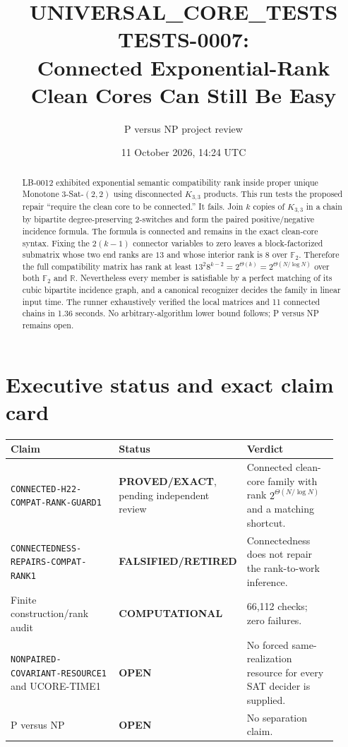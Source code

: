 \documentclass[11pt]{article}
\title{UNIVERSAL\_CORE\_TESTS TESTS-0007:\\
Connected Exponential-Rank Clean Cores Can Still Be Easy}
\author{P versus NP project review}
\date{11 October 2026, 14:24 UTC}
\newcommand{\EXACT}{\textbf{PROVED/EXACT}}
\newcommand{\OPEN}{\textbf{OPEN}}
\newcommand{\RETIRED}{\textbf{FALSIFIED/RETIRED}}
\newcommand{\COMP}{\textbf{COMPUTATIONAL}}
\begin{document}
\maketitle

\begin{abstract}
LB-0012 exhibited exponential semantic compatibility rank inside proper
unique Monotone 3-Sat-$(2,2)$ using disconnected $K_{3,3}$ products.  This
run tests the proposed repair ``require the clean core to be connected.''
It fails.  Join $k$ copies of $K_{3,3}$ in a chain by bipartite
degree-preserving 2-switches and form the paired positive/negative incidence
formula.  The formula is connected and remains in the exact clean-core
syntax.  Fixing the $2(k-1)$ connector variables to zero leaves a
block-factorized submatrix whose two end ranks are $13$ and whose interior
rank is $8$ over $\mathbb F_2$.  Therefore the full compatibility matrix has
rank at least $13^2 8^{k-2}=2^{\Theta(k)}=
2^{\Theta(N/\log N)}$ over both $\mathbb F_2$ and $\mathbb R$.  Nevertheless
every member is satisfiable by a perfect matching of its cubic bipartite
incidence graph, and a canonical recognizer decides the family in linear
input time.  The runner exhaustively verified the local matrices and 11
connected chains in 1.36 seconds.  No arbitrary-algorithm lower bound
follows; P versus NP remains open.
\end{abstract}

\section{Executive status and exact claim card}

\begin{center}
\small
\begin{tabular}{@{}p{0.39\linewidth}p{0.20\linewidth}p{0.33\linewidth}@{}}
\toprule
Claim & Status & Verdict\\
\midrule
\texttt{CONNECTED-H22-COMPAT-RANK-GUARD1} & \EXACT, pending independent review &
Connected clean-core family with rank $2^{\Theta(N/\log N)}$ and a matching shortcut.\\
\texttt{CONNECTEDNESS-REPAIRS-COMPAT-RANK1} & \RETIRED &
Connectedness does not repair the rank-to-work inference.\\
Finite construction/rank audit & \COMP & 66,112 checks; zero failures.\\
\texttt{NONPAIRED-COVARIANT-RESOURCE1} and UCORE-TIME1 & \OPEN &
No forced same-realization resource for every SAT decider is supplied.\\
P versus NP & \OPEN & No separation claim.\\
\bottomrule
\end{tabular}
\end{center}
\end{document}
